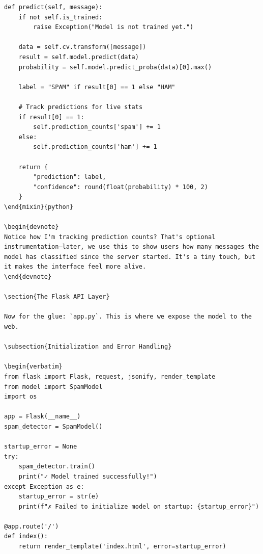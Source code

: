 \documentclass[12pt, a4paper]{article}
\begin{document}
\begin{verbatim}
def predict(self, message):
    if not self.is_trained:
        raise Exception("Model is not trained yet.")
    
    data = self.cv.transform([message])
    result = self.model.predict(data)
    probability = self.model.predict_proba(data)[0].max()
    
    label = "SPAM" if result[0] == 1 else "HAM"
    
    # Track predictions for live stats
    if result[0] == 1:
        self.prediction_counts['spam'] += 1
    else:
        self.prediction_counts['ham'] += 1
    
    return {
        "prediction": label,
        "confidence": round(float(probability) * 100, 2)
    }
\end{mixin}{python}

\begin{devnote}
Notice how I'm tracking prediction counts? That's optional instrumentation—later, we use this to show users how many messages the model has classified since the server started. It's a tiny touch, but it makes the interface feel more alive.
\end{devnote}

\section{The Flask API Layer}

Now for the glue: `app.py`. This is where we expose the model to the web.

\subsection{Initialization and Error Handling}

\begin{verbatim}
from flask import Flask, request, jsonify, render_template
from model import SpamModel
import os

app = Flask(__name__)
spam_detector = SpamModel()

startup_error = None
try:
    spam_detector.train()
    print("✓ Model trained successfully!")
except Exception as e:
    startup_error = str(e)
    print(f"✗ Failed to initialize model on startup: {startup_error}")

@app.route('/')
def index():
    return render_template('index.html', error=startup_error)
\end{verbatim}
\end{document}
